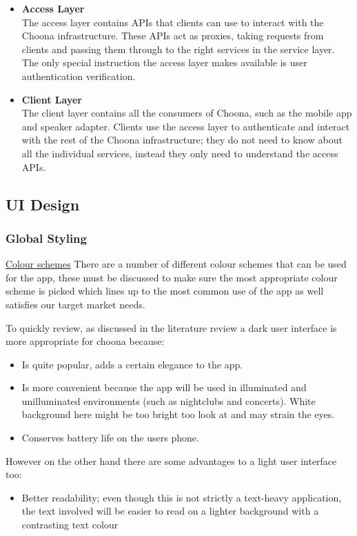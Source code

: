 \begin{itemize}
  \item \textbf{Access Layer}\\
    The access layer contains APIs that clients can use to interact with the Choona infrastructure. These APIs act as proxies, taking requests from clients and passing them through to the right services in the service layer. The only special instruction the access layer makes available is user authentication verification.

  \item \textbf{Client Layer}\\
    The client layer contains all the consumers of Choona, such as the mobile app and speaker adapter. Clients use the access layer to authenticate and interact with the rest of the Choona infrastructure; they do not need to know about all the individual services, instead they only need to understand the access APIs.
\end{itemize}

\subsection{UI Design}

\subsubsection*{Global Styling}

\noindent\underline{Colour schemes}\newline
There are a number of different colour schemes that can be used for the app, these must be discussed to make sure the most appropriate colour scheme is picked which lines up to the most common use of the app as well satisfies our target market needs.

To quickly review, as discussed in the literature review a dark user interface is more appropriate for choona because:
\begin{itemize}
\item Is quite popular, adds a certain elegance to the app.
\item Is more convenient because the app will be used in illuminated and unilluminated environments (such as nightclubs and concerts). White background here might be too bright too look at and may strain the eyes.
\item Conserves battery life on the users phone.
\end{itemize}

\noindent However on the other hand there are some advantages to a light user interface too:
\begin{itemize}
\item Better readability; even though this is not strictly a text-heavy application, the text involved will be easier to read on a lighter background with a contrasting text colour
\end{itemize}

